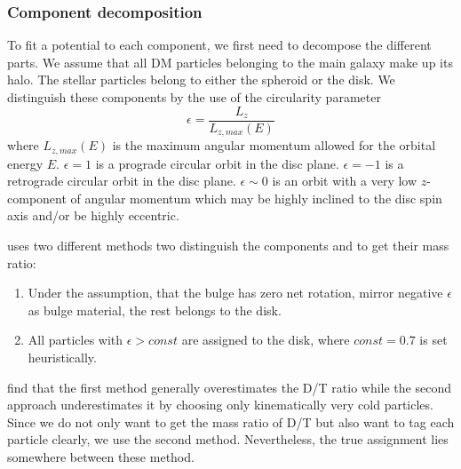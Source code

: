 \subsubsection{Component decomposition}\label{subsubsec:decomp}
To fit a potential to each component, we first need to decompose the different parts. We assume that all \ac{DM} particles belonging to the main galaxy make up its halo. The stellar particles belong to either the spheroid or the disk. We distinguish these components by the use of the circularity parameter 
\begin{equation}
    \epsilon = \frac{L_z}{L_{z,max}(E)}
\end{equation}
where $L_{z,max}(E)$ is the maximum angular momentum allowed for the orbital energy $E$. 
$\epsilon = 1$ is a prograde circular orbit in the disc plane. $\epsilon = -1$ is a retrograde circular orbit in the disc plane. $\epsilon \sim 0$ is an orbit with a very low $z$-component of angular momentum which may be highly inclined to the disc spin axis and/or be highly eccentric.  

\cite{AurigaGrand} uses two different methods two distinguish the components and to get their mass ratio:
\begin{enumerate}
\item Under the assumption, that the bulge has zero net rotation, mirror negative $\epsilon$ as bulge material, the rest belongs to the disk.
\item All particles with $\epsilon > const$ are assigned to the disk, where $const = 0.7$ is set heuristically.
\end{enumerate}

\cite{AurigaGrand} find that the first method generally overestimates the \ac{D/T} ratio while the second approach underestimates it by choosing only kinematically very cold particles. Since we do not only want to get the mass ratio of \ac{D/T} but also want to tag each particle clearly, we use the second method. Nevertheless, the true assignment lies somewhere between these method. 

